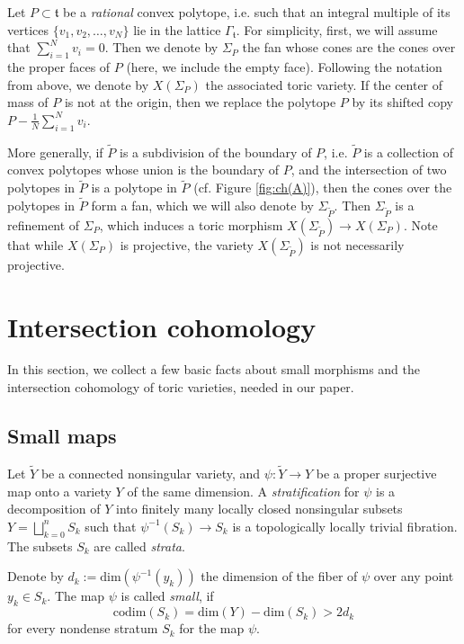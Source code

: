 \documentclass[11pt]{article}
\theoremstyle{definition}
\numberwithin{equation}{section}
\begin{document}
Let $P\subset\mathfrak{t}$ be a  \textit{rational} convex polytope, i.e.  
such that an integral multiple of its vertices $ \{v_1,v_2,\dots,v_N\} $ lie in 
the lattice $ \Gamma_\mathfrak{t} $. For simplicity, first, we will assume that $ 
\sum_{i=1}^{N}v_i=0 $. 
Then we denote by $\Sigma_P$ the fan whose cones are the cones over the proper
faces of $P$ (here, we include the empty face). Following the notation from above, we denote by $X(\Sigma_P)$ the associated toric variety. If the center of mass of $ P $ is not at the origin, then we replace the polytope $P$ by its shifted copy $P- 
\frac1N\sum_{i=1}^{N}v_i$. \label{projectivefan}

 More generally, if $\widetilde{P}$ is a subdivision of the boundary of $P$, 
 i.e.  $\widetilde{P}$ is a collection of convex polytopes whose union is the 
 boundary of $P$, and the intersection of two polytopes in $\widetilde{P}$ is a 
 polytope in $\widetilde{P}$ (cf.  Figure \ref{fig:ch(A)}), then the cones over 
 the polytopes in $\widetilde{P}$ form a fan, which we will also denote by 
 $\Sigma_{\widetilde{P}}$.
Then $\Sigma_{\widetilde{P}}$ is a refinement of $\Sigma_{{P}}$, which induces 
a toric morphism $X(\Sigma_{\widetilde{P}})\to X(\Sigma_{{P}})$.
Note that while $X(\Sigma_P)$ is projective, the variety $ 
X(\Sigma_{\widetilde{P}}) $ is not necessarily projective. 




\section{Intersection cohomology}\label{sec:intcoh}
In this section, we collect a few basic facts about small morphisms and the 
intersection cohomology of toric varieties, needed in our paper.  
\subsection{Small maps}\label{S3.1}


Let $ \widetilde{Y}$ be a connected nonsingular  
variety, and $\psi: \widetilde{Y}\to Y$ be a proper surjective map onto a 
variety $ Y $ of the same dimension. 
A \textit{stratification} for $\psi$  is a decomposition of $Y$ into finitely many 
locally closed nonsingular subsets $Y = \bigsqcup_{k=0}^n S_k$ such that 
$\psi^{-1}(S_k) \to S_k$ is a topologically locally trivial fibration. The subsets 
$S_k$ are called \textit{strata}.

 
Denote by $d_k:=\mathrm{dim}(\psi^{-1}(y_k))$ the dimension of the fiber of $ \psi $ 
over any point $y_k\in S_k$. The map $\psi$ is called \textit{small}, if
\begin{equation}\label{small}
\mathrm{codim}(S_k) =  \mathrm{dim}(Y) - \mathrm{dim}(S_k) > 2d_k
\end{equation}
 for every nondense stratum $ S_k $ for the map $\psi$. 
\end{document}
